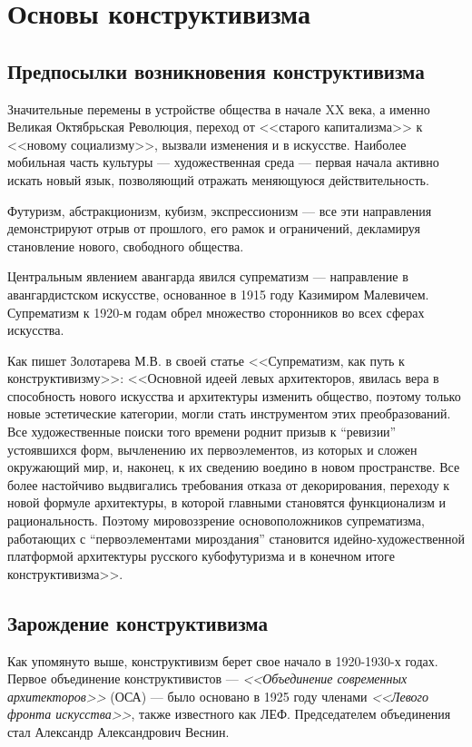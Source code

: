 \chapter{Основы конструктивизма}
\section{Предпосылки возникновения конструктивизма}
Значительные перемены в устройстве общества в начале XX века, а именно Великая Октябрьская Революция,
переход от <<старого капитализма>> к <<новому социализму>>, вызвали изменения и в искусстве.
Наиболее мобильная часть культуры --- художественная среда --- первая начала активно искать
новый язык, позволяющий отражать меняющуюся действительность.

Футуризм, абстракционизм, кубизм, экспрессионизм --- все эти направления демонстрируют отрыв от
прошлого, его рамок и ограничений, декламируя становление нового, свободного общества.

Центральным явлением авангарда явился супрематизм ---
направление в авангардистском искусстве, основанное в 1915 году Казимиром Малевичем.
Супрематизм к 1920-м годам обрел множество сторонников во всех сферах искусства.

Как пишет Золотарева М.В. в своей статье <<Супрематизм, как путь к конструктивизму>>:
<<Основной идеей левых архитекторов, явилась вера
в способность нового искусства и архитектуры изменить
общество, поэтому только новые эстетические категории,
могли стать инструментом этих преобразований.
Все художественные поиски того времени роднит призыв к ``ревизии'' устоявшихся форм,
вычленению их первоэлементов, из которых и сложен окружающий мир, и, наконец, к
их сведению воедино в новом пространстве.
Все более настойчиво выдвигались требования отказа от декорирования, переходу к новой формуле архитектуры, в которой
главными становятся функционализм и рациональность.
Поэтому мировоззрение основоположников супрематизма, работающих с ``первоэлементами мироздания''
становится идейно-художественной платформой архитектуры русского кубофутуризма и в конечном итоге
конструктивизма>>\cite{золотарева2015суприматизм}.

\section{Зарождение конструктивизма}
Как упомянуто выше, конструктивизм берет свое начало в 1920-1930-х годах.
Первое объединение конструктивистов --- \textit{<<Объединение современных архитекторов>>} (ОСА) ---
было основано в 1925 году членами \textit{<<Левого фронта искусства>>}, также известного как ЛЕФ.
Председателем объединения стал Александр Александрович Веснин.

